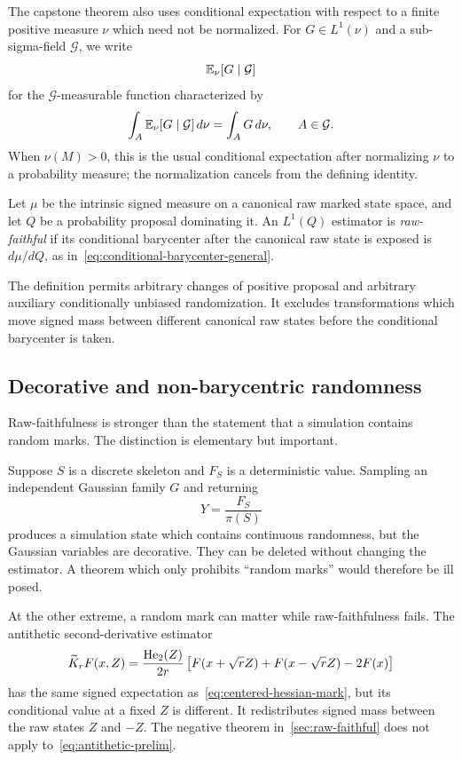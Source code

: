 The capstone theorem also uses conditional expectation with respect to a finite positive measure $\nu$ which need not be normalized. For $G\in L^1(\nu)$ and a sub-sigma-field $\mathcal G$, we write
\begin{equation*}
  \mathbb E_\nu[G\mid\mathcal G]
\end{equation*}
for the $\mathcal G$-measurable function characterized by
\begin{equation*}
  \int_A\mathbb E_\nu[G\mid\mathcal G]\,d\nu
  =
  \int_A G\,d\nu,
  \qquad A\in\mathcal G.
\end{equation*}
When $\nu(M)>0$, this is the usual conditional expectation after normalizing $\nu$ to a probability measure; the normalization cancels from the defining identity.

\begin{definition}
\label{def:raw-faithful}
Let $\mu$ be the intrinsic signed measure on a canonical raw marked state space, and let $Q$ be a probability proposal dominating it. An $L^1(Q)$ estimator is \emph{raw-faithful} if its conditional barycenter after the canonical raw state is exposed is $d\mu/dQ$, as in~\eqref{eq:conditional-barycenter-general}.
\end{definition}

The definition permits arbitrary changes of positive proposal and arbitrary auxiliary conditionally unbiased randomization. It excludes transformations which move signed mass between different canonical raw states before the conditional barycenter is taken.

\subsection{Decorative and non-barycentric randomness}

Raw-faithfulness is stronger than the statement that a simulation contains random marks. The distinction is elementary but important.

Suppose $S$ is a discrete skeleton and $F_S$ is a deterministic value. Sampling an independent Gaussian family $G$ and returning
\begin{equation*}
  Y=\frac{F_S}{\pi(S)}
\end{equation*}
produces a simulation state which contains continuous randomness, but the Gaussian variables are decorative. They can be deleted without changing the estimator. A theorem which only prohibits ``random marks'' would therefore be ill posed.

At the other extreme, a random mark can matter while raw-faithfulness fails. The antithetic second-derivative estimator
\begin{equation}
  \widetilde K_rF(x,Z)
  =
  \frac{\operatorname{He}_2(Z)}{2r}
  \left[F(x+\sqrt rZ)+F(x-\sqrt rZ)-2F(x)\right]
  \label{eq:antithetic-prelim}
\end{equation}
has the same signed expectation as~\eqref{eq:centered-hessian-mark}, but its conditional value at a fixed $Z$ is different. It redistributes signed mass between the raw states $Z$ and $-Z$. The negative theorem in~\cref{sec:raw-faithful} does not apply to~\eqref{eq:antithetic-prelim}.

